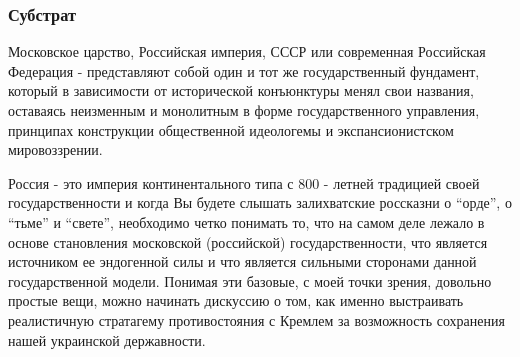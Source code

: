  
 
 
 
 

\subsubsection{Субстрат}
\label{sec:16_01_2022.stz.news.ua.hvylya.1.anatomia_vraga.1.substrat}

Московское царство, Российская империя, СССР или современная Российская
Федерация - представляют собой один и тот же государственный фундамент, который
в зависимости от исторической конъюнктуры менял свои названия, оставаясь
неизменным и монолитным в форме государственного управления, принципах
конструкции общественной идеологемы и экспансионистском мировоззрении.

Россия - это империя континентального типа с 800 - летней традицией своей
государственности и когда Вы будете слышать залихватские россказни о \enquote{орде}, о
\enquote{тьме} и \enquote{свете}, необходимо четко понимать то, что на самом деле лежало в
основе становления московской (российской) государственности, что является
источником ее эндогенной силы и что является сильными сторонами данной
государственной модели. Понимая эти базовые, с моей точки зрения, довольно
простые вещи, можно начинать дискуссию о том, как именно выстраивать
реалистичную стратагему противостояния с Кремлем за возможность сохранения
нашей украинской державности.
